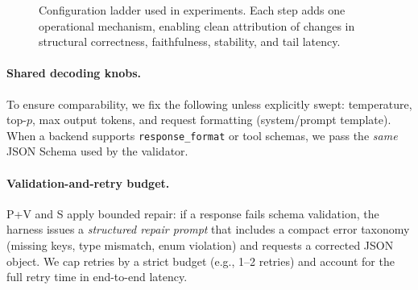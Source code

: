 \begin{figure}[t]
\centering
{}
\caption{Configuration ladder used in experiments.
Each step adds one operational mechanism, enabling clean attribution of changes in structural correctness, faithfulness, stability, and tail latency.}
\label{fig:config-ladder}
\end{figure}

\paragraph{Shared decoding knobs.}
To ensure comparability, we fix the following unless explicitly swept:
temperature, top-$p$, max output tokens, and request formatting (system/prompt template).
When a backend supports \texttt{response\_format} or tool schemas, we pass the \emph{same} JSON Schema used by the validator.

\paragraph{Validation-and-retry budget.}
P+V and S apply bounded repair: if a response fails schema validation, the harness issues a \emph{structured repair prompt} that includes a compact error taxonomy (missing keys, type mismatch, enum violation) and requests a corrected JSON object.
We cap retries by a strict budget (e.g., 1--2 retries) and account for the full retry time in end-to-end latency.

